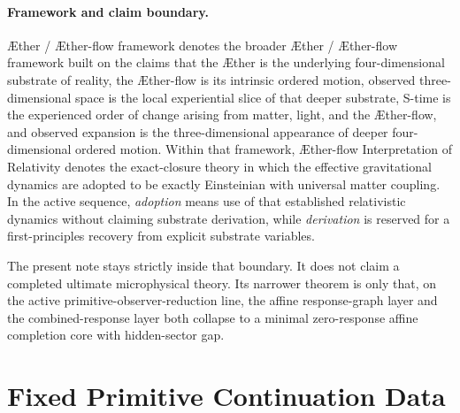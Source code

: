 \documentclass[11pt]{article}
\newcommand{\Aether}{\AE{}ther}
\newcommand{\Aflow}{\AE{}ther-flow}
\newcommand{\TheoryName}{\Aflow{} Interpretation of Relativity}
\newcommand{\TheoryProgram}{\Aether{} / \Aflow{} framework}
\begin{document}
\paragraph{Framework and claim boundary.}
\TheoryProgram{} denotes the broader \Aether{} / \Aflow{} framework built on the claims that the \Aether{} is the underlying four-dimensional substrate of reality, the \Aflow{} is its intrinsic ordered motion, observed three-dimensional space is the local experiential slice of that deeper substrate, S-time is the experienced order of change arising from matter, light, and the \Aflow{}, and observed expansion is the three-dimensional appearance of deeper four-dimensional ordered motion. Within that framework, \TheoryName{} denotes the exact-closure theory in which the effective gravitational dynamics are adopted to be exactly Einsteinian with universal matter coupling. In the active sequence, \emph{adoption} means use of that established relativistic dynamics without claiming substrate derivation, while \emph{derivation} is reserved for a first-principles recovery from explicit substrate variables.

The present note stays strictly inside that boundary. It does not claim a completed ultimate microphysical theory. Its narrower theorem is only that, on the active primitive-observer-reduction line, the affine response-graph layer and the combined-response layer both collapse to a minimal zero-response affine completion core with hidden-sector gap.

\section{Fixed Primitive Continuation Data}
\end{document}

